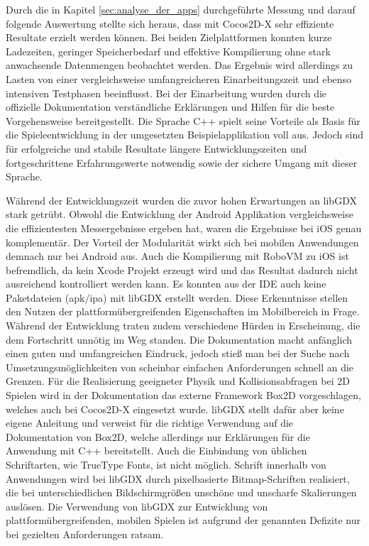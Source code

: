 \bigskip
Durch die in Kapitel \ref{sec:analyse_der_apps} durchgeführte Messung und darauf folgende Auswertung stellte sich heraus, dass mit Cocos2D-X sehr effiziente Resultate erzielt werden können. Bei beiden Zielplattformen konnten kurze Ladezeiten, geringer Speicherbedarf und effektive Kompilierung ohne stark anwachsende Datenmengen beobachtet werden. Das Ergebnis wird allerdings zu Lasten von einer vergleichsweise umfangreicheren Einarbeitungszeit und ebenso intensiven Testphasen beeinflusst. Bei der Einarbeitung wurden durch die offizielle Dokumentation verständliche Erklärungen und Hilfen für die beste Vorgehensweise bereitgestellt. Die Sprache C++ spielt seine Vorteile als Basis für die Spieleentwicklung in der umgesetzten Beispielapplikation voll aus. Jedoch sind für erfolgreiche und stabile Resultate längere Entwicklungszeiten und fortgeschrittene Erfahrungswerte notwendig sowie der sichere Umgang mit dieser Sprache.

\bigskip
Während der Entwicklungszeit wurden die zuvor hohen Erwartungen an libGDX stark getrübt. Obwohl die Entwicklung der Android Applikation vergleichsweise die effizientesten Messergebnisse ergeben hat, waren die Ergebnisse bei iOS genau komplementär. Der Vorteil der Modularität wirkt sich bei mobilen Anwendungen demnach nur bei Android aus. Auch die Kompilierung mit RoboVM zu iOS ist befremdlich, da kein Xcode Projekt erzeugt wird und das Resultat dadurch nicht ausreichend kontrolliert werden kann. Es konnten aus der IDE auch keine Paketdateien (apk/ipa) mit libGDX erstellt werden. Diese Erkenntnisse stellen den Nutzen der plattformübergreifenden Eigenschaften im Mobilbereich in Frage. Während der Entwicklung traten zudem verschiedene Hürden in Erscheinung, die dem Fortschritt unnötig im Weg standen. Die Dokumentation macht anfänglich einen guten und umfangreichen Eindruck, jedoch stieß man bei der Suche nach Umsetzungsmöglichkeiten von scheinbar einfachen Anforderungen schnell an die Grenzen. Für die Realisierung geeigneter Physik und Kollisionsabfragen bei 2D Spielen wird in der Dokumentation das externe Framework Box2D vorgeschlagen, welches auch bei Cocos2D-X eingesetzt wurde. libGDX stellt dafür aber keine eigene Anleitung und verweist für die richtige Verwendung auf die Dokumentation von Box2D, welche allerdings nur Erklärungen für die Anwendung mit C++ bereitstellt. Auch die Einbindung von üblichen Schriftarten, wie TrueType Fonts, ist nicht möglich. Schrift innerhalb von Anwendungen wird bei libGDX durch pixelbasierte Bitmap-Schriften realisiert, die bei unterschiedlichen Bildschirmgrößen unschöne und unscharfe Skalierungen auslösen. Die Verwendung von libGDX zur Entwicklung von plattformübergreifenden, mobilen Spielen ist aufgrund der genannten Defizite nur bei gezielten Anforderungen ratsam. 

